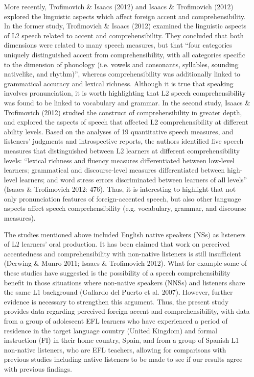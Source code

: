 \documentclass[12pt]{article}
\newenvironment{styleStandard}{\setlength\leftskip{0cm}\setlength\rightskip{0cm plus 1fil}\setlength\parindent{0cm}\setlength\parfillskip{0pt plus 1fil}\setlength\parskip{0in plus 1pt}\writerlistparindent\writerlistleftskip\leavevmode\normalfont\normalsize\writerlistlabel\ignorespaces}{\unskip\vspace{0.111in plus 0.0111in}\par}
\newcommand\writerlistleftskip{}
\newcommand\writerlistparindent{}
\newcommand\writerlistlabel{}
\begin{document}
\begin{styleStandard}
More recently, Trofimovich \& Isaacs (2012) and Isaacs \& Trofimovich (2012) explored the linguistic aspects which affect foreign accent and comprehensibility. In the former study, Trofimovich \& Isaacs (2012) examined the linguistic aspects of L2 speech related to accent and comprehensibility. They concluded that both dimensions were related to many speech measures, but that “four categories uniquely distinguished accent from comprehensibility, with all categories specific to the dimension of phonology (i.e. vowels and consonants, syllables, sounding nativelike, and rhythm)”, whereas comprehensibility was additionally linked to grammatical accuracy and lexical richness. Although it is true that speaking involves pronunciation, it is worth highlighting that L2 speech comprehensibility was found to be linked to vocabulary and grammar. In the second study, Isaacs \& Trofimovich (2012) studied the construct of comprehensibility in greater depth, and explored the aspects of speech that affected L2 comprehensibility at different ability levels. Based on the analyses of 19 quantitative speech measures, and listeners’ judgments and introspective reports, the authors identified five speech measures that distinguished between L2 learners at different comprehensibility levels: “lexical richness and fluency measures differentiated between low-level learners; grammatical and discourse-level measures differentiated between high-level learners; and word stress errors discriminated between learners of all levels” (Isaacs \& Trofimovich 2012: 476). Thus, it is interesting to highlight that not only pronunciation features of foreign-accented speech, but also other language aspects affect speech comprehensibility (e.g. vocabulary, grammar, and discourse measures). 
\end{styleStandard}

\begin{styleStandard}
The studies mentioned above included English native speakers (NSs) as listeners of L2 learners’ oral production. It has been claimed that work on perceived accentedness and comprehensibility with non-native listeners is still insufficient (Derwing \& Munro 2011; Isaacs \& Trofimovich 2012). What for example some of these studies have suggested is the possibility of a speech comprehensibility benefit in those situations where non-native speakers (NNSs) and listeners share the same L1 background (Gallardo del Puerto et al. 2007). However, further evidence is necessary to strengthen this argument. Thus, the present study provides data regarding perceived foreign accent and comprehensibility, with data from a group of adolescent EFL learners who have experienced a period of residence in the target language country (United Kingdom) and formal instruction (FI) in their home country, Spain, and from a group of Spanish L1 non-native listeners, who are EFL teachers, allowing for comparisons with previous studies including native listeners to be made to see if our results agree with previous findings. 
\end{styleStandard}
\end{document}
